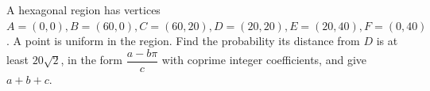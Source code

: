A hexagonal region has vertices $A=(0,0),B=(60,0),C=(60,20),D=(20,20),E=(20,40),F=(0,40)$. A point is uniform in the region. Find the probability its distance from $D$ is at least $20\sqrt2$, in the form $\dfrac{a-b\pi}{c}$ with coprime integer coefficients, and give $a+b+c$.

